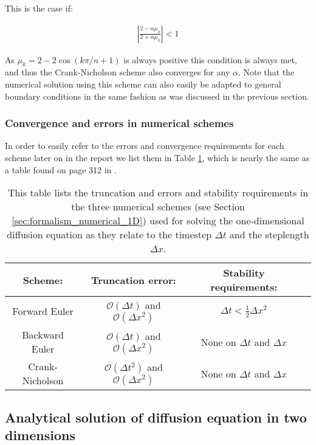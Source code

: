 \documentclass[reprint,english,notitlepage]{revtex4-1}  %
\begin{document}
This is the case if:

\begin{align*}
| \frac{2 - \alpha \mu_k}{2 + \alpha \mu_k} | < 1
\end{align*}

As $\mu_k = 2 - 2 \cos(k\pi/n + 1)$ is always positive this condition is always met, and thus the Crank-Nicholson scheme also converges for any $\alpha$. Note that the numerical solution using this scheme can also easily be adapted to general boundary conditions in the same fashion as was discussed in the previous section.

\subsubsection{Convergence and errors in numerical schemes} \label{sec:formalism_1D_diff_eq_numerical_conv_and_err}

In order to easily refer to the errors and convergence requirements for each scheme later on in the report we list them in Table \ref{table:schemes_conv_and_err_1D}, which is nearly the same as a table found on page 312 in \citep{Hjorth-Jensen2015}.

\begin{table}[H]
\centering
\caption{This table lists the truncation and errors and stability requirements in the three numerical schemes (see Section \ref{sec:formalism_numerical_1D}) used for solving the one-dimensional diffusion equation as they relate to the timestep $\Delta t$ and the steplength $\Delta x$.} \label{table:schemes_conv_and_err_1D}
\begin{tabular}{|c|c|c|c|}
\hline
Scheme: & Truncation error: & Stability requirements: \\
\hline
Forward Euler & $\mathcal{O}(\Delta t)$ and $\mathcal{O}(\Delta x^2)$ & $\Delta t < \frac{1}{2} \Delta x^2$ \\
\hline
Backward Euler & $\mathcal{O}(\Delta t)$ and $\mathcal{O}(\Delta x^2)$ & None on $\Delta t$ and $\Delta x$ \\\hline
Crank-Nicholson & $\mathcal{O}(\Delta t^2)$ and $\mathcal{O}(\Delta x^2)$ & None on $\Delta t$ and $\Delta x$ \\
\hline
\end{tabular}
\end{table}




\subsection{Analytical solution of diffusion equation in two dimensions} \label{sec:formalism_2D_diff_eq_analytical}
\end{document}
